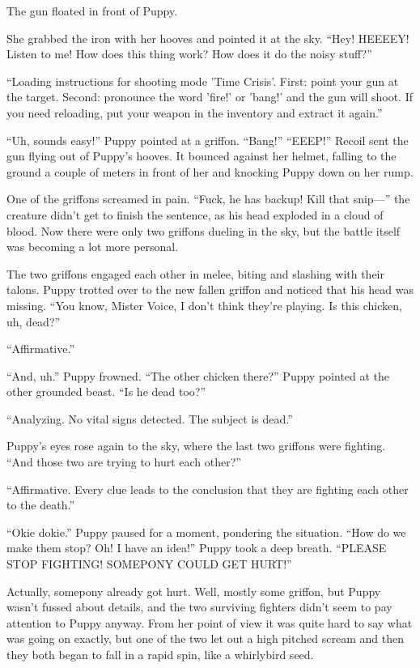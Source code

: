 The gun floated in front of Puppy.

She grabbed the iron with her hooves and pointed it at the sky. ``Hey! HEEEEY! Listen to me! How does this thing work? How does it do the noisy stuff?''

{\mten ``Loading instructions for shooting mode 'Time Crisis'. First: point your gun at the target. Second: pronounce the word 'fire!' or 'bang!' and the gun will shoot. If you need reloading, put your weapon in the inventory and extract it again.''}

``Uh, sounds easy!'' Puppy pointed at a griffon. ``Bang!''   ``EEEP!'' Recoil sent the gun flying out of Puppy's hooves. It bounced against her helmet, falling to the ground a couple of meters in front of her and knocking Puppy down on her rump.

One of the griffons screamed in pain. ``Fuck, he has backup! Kill that snip---'' the creature didn't get to finish the sentence, as his head exploded in a cloud of blood. Now there were only two griffons dueling in the sky, but the battle itself was becoming a lot more personal.

The two griffons engaged each other in melee, biting and slashing with their talons. Puppy trotted over to the new fallen griffon and noticed that his head was missing. ``You know, Mister Voice, I don't think they're playing. Is this chicken, uh, dead?''

{\mten ``Affirmative.''}

``And, uh.'' Puppy frowned. ``The other chicken there?'' Puppy pointed at the other grounded beast. ``Is he dead too?''

{\mten ``Analyzing. No vital signs detected. The subject is dead.''}

Puppy's eyes rose again to the sky, where the last two griffons were fighting. ``And those two are trying to hurt each other?''

{\mten ``Affirmative. Every clue leads to the conclusion that they are fighting each other to the death.''}

``Okie dokie.'' Puppy paused for a moment, pondering the situation. ``How do we make them stop? Oh! I have an idea!'' Puppy took a deep breath. ``PLEASE STOP FIGHTING! SOMEPONY COULD GET HURT!''

Actually, somepony already got hurt. Well, mostly some griffon, but Puppy wasn't fussed about details, and the two surviving fighters didn't seem to pay attention to Puppy anyway. From her point of view it was quite hard to say what was going on exactly, but one of the two let out a high pitched scream and then they both began to fall in a rapid spin, like a whirlybird seed.

